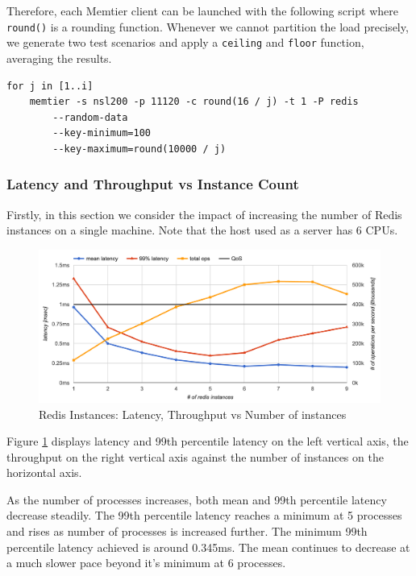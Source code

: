 Therefore, each Memtier client can be launched with the following script where \texttt{round()} is a rounding function. Whenever we cannot partition the load precisely, we generate two test scenarios and apply a \texttt{ceiling} and \texttt{floor} function, averaging the results.

\begin{lstlisting}
for j in [1..i]
    memtier -s nsl200 -p 11120 -c round(16 / j) -t 1 -P redis
        --random-data
        --key-minimum=100
        --key-maximum=round(10000 / j)
\end{lstlisting}

\subsubsection{Latency and Throughput vs Instance Count}

Firstly, in this section we consider the impact of increasing the number of Redis instances on a single machine. Note that the host used as a server has 6 CPUs.

\begin{figure}[h]
    \includegraphics[width=\textwidth]{./res/6_instances_latency_ops.png}
    \caption{Redis Instances: Latency, Throughput vs Number of instances}
    \label{fig:redis-instances-latency-ops}
\end{figure}

Figure \ref{fig:redis-instances-latency-ops} displays latency and 99th percentile latency on the left vertical axis, the throughput on the right vertical axis against the number of instances on the horizontal axis.

As the number of processes increases, both mean and 99th percentile latency decrease steadily. The 99th percentile latency reaches a minimum at 5 processes and rises as number of processes is increased further. The minimum 99th percentile latency achieved is around 0.345ms. The mean continues to decrease at a much slower pace beyond it's minimum at 6 processes.

